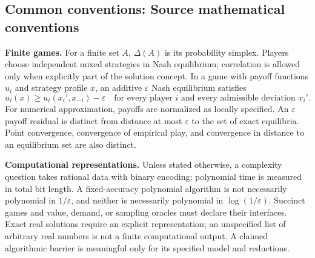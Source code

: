 \documentclass[11pt,a4paper]{article}
\begin{document}


\par\endgroup

\subsection*{Common conventions: Source mathematical conventions}

\textbf{Finite games.} For a finite set $A$, $\Delta(A)$ is its probability
simplex. Players choose independent mixed strategies in Nash equilibrium;
correlation is allowed only when explicitly part of the solution concept.
In a game with payoff functions $u_i$ and strategy profile $x$, an additive
$\varepsilon$ Nash equilibrium satisfies
\[
 u_i(x)\geq u_i(x_i',x_{-i})-\varepsilon
 \quad\text{for every player $i$ and every admissible deviation $x_i'$}.
\]
For numerical approximation, payoffs are normalized as locally specified.
An $\varepsilon$ payoff residual is distinct from distance at most
$\varepsilon$ to the set of exact equilibria. Point convergence, convergence
of empirical play, and convergence in distance to an equilibrium set are
also distinct.

\textbf{Computational representations.} Unless stated otherwise, a complexity
question takes rational data with binary encoding; polynomial time is measured
in total bit length. A fixed-accuracy polynomial algorithm is not necessarily
polynomial in $1/\varepsilon$, and neither is necessarily polynomial in
$\log(1/\varepsilon)$. Succinct games and value, demand, or sampling oracles
must declare their interfaces. Exact real solutions require an explicit
representation; an unspecified list of arbitrary real numbers is not a
finite computational output. A claimed algorithmic barrier is meaningful
only for its specified model and reductions.
\end{document}
